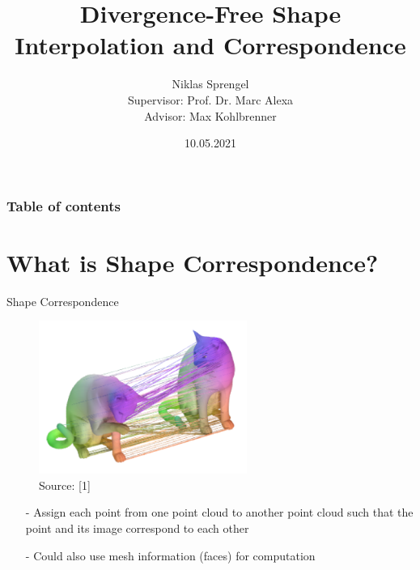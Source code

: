 \documentclass[xcolor=dvipsnames]{beamer}
\title[Divergence-Free Shape Interpolation]{Divergence-Free Shape Interpolation and Correspondence}
\author[CG]{Niklas Sprengel \\ Supervisor: Prof. Dr. Marc Alexa\\Advisor: Max Kohlbrenner}
\institute{TU Berlin}
\date{10.05.2021}
\begin{document}
\begin{frame}
  \titlepage
\end{frame}
\begin{frame}
\frametitle{Table of contents}
\tableofcontents
\end{frame}

\section{What is Shape Correspondence?}
\begin{frame}{Shape Correspondence}
\begin{figure}
\includegraphics[height=5cm]{Pictures/cat.png}
\caption*{Source: [1]}
\end{figure}
\begin{enumerate}
\item[-] Assign each point from one point cloud to another point cloud such that the point and its image correspond to each other
\item[-] Could also use mesh information (faces) for computation
\end{enumerate}
\end{frame}
\end{document}
